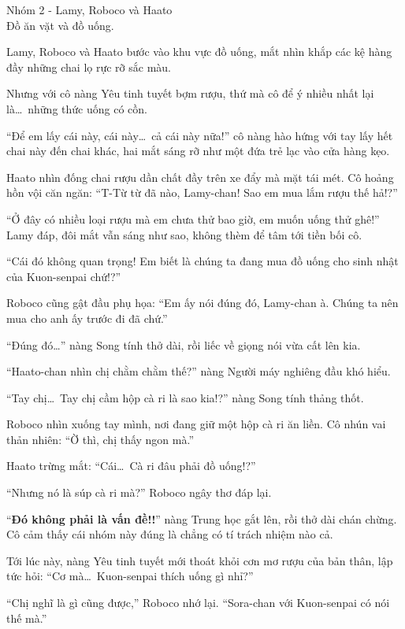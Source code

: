 \documentclass[../main.tex]{subfiles}
\begin{document}
\begin{center}
    {\color{T2} Nhóm 2 - Lamy, Roboco và Haato\\Đồ ăn vặt và đồ uống.}
\end{center}

Lamy, Roboco và Haato bước vào khu vực đồ uống, mắt nhìn khắp các kệ hàng đầy những chai lọ rực rỡ sắc màu.

Nhưng với cô nàng Yêu tinh tuyết bợm rượu, thứ mà cô để ý nhiều nhất lại là\dots\ những thức uống có cồn.

``Để em lấy cái này, cái này\dots\ cả cái này nữa!'' cô nàng hào hứng với tay lấy hết chai này đến chai khác, hai mắt sáng rỡ như một đứa trẻ lạc vào cửa hàng kẹo.

Haato nhìn đống chai rượu dần chất đầy trên xe đẩy mà mặt tái mét. Cô hoảng hồn vội căn ngăn: ``T-Từ từ đã nào, Lamy-chan! Sao em mua lắm rượu thế hả!?''

``Ở đây có nhiều loại rượu mà em chưa thử bao giờ, em muốn uống thử ghê!'' Lamy đáp, đôi mắt vẫn sáng như sao, không thèm để tâm tới tiền bối cô.

``Cái đó không quan trọng! Em biết là chúng ta đang mua đồ uống cho sinh nhật của Kuon-senpai chứ!?''

Roboco cũng gật đầu phụ họa: ``Em ấy nói đúng đó, Lamy-chan à. Chúng ta nên mua cho anh ấy trước đi đã chứ.''

``Đúng đó\dots'' nàng Song tính thở dài, rồi liếc về giọng nói vừa cất lên kia.

``Haato-chan nhìn chị chằm chằm thế?'' nàng Người máy nghiêng đầu khó hiểu.

``Tay chị\dots\ Tay chị cầm hộp cà ri là sao kia!?'' nàng Song tính thảng thốt.

Roboco nhìn xuống tay mình, nơi đang giữ một hộp cà ri ăn liền. Cô nhún vai thản nhiên: ``Ờ thì, chị thấy ngon mà.''

Haato trừng mắt: ``Cái\dots\ Cà ri đâu phải đồ uống!?''

``Nhưng nó là súp cà ri mà?'' Roboco ngây thơ đáp lại.

``\textbf{Đó không phải là vấn đề!!}'' nàng Trung học gắt lên, rồi thở dài chán chừng. Cô cảm thấy cái nhóm này đúng là chẳng có tí trách nhiệm nào cả.

Tới lúc này, nàng Yêu tinh tuyết mới thoát khỏi cơn mơ rượu của bản thân, lập tức hỏi: ``Cơ mà\dots\ Kuon-senpai thích uống gì nhỉ?''

``Chị nghĩ là gì cũng được,'' Roboco nhớ lại. ``Sora-chan với Kuon-senpai có nói thế mà.''
\end{document}
